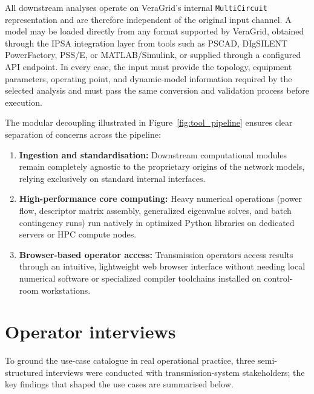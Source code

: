 All downstream analyses operate on VeraGrid's internal \texttt{MultiCircuit} representation and are therefore independent of the original input channel. A model may be loaded directly from any format supported by VeraGrid, obtained through the IPSA integration layer from tools such as PSCAD, DIgSILENT PowerFactory, PSS/E, or MATLAB/Simulink, or supplied through a configured API endpoint. In every case, the input must provide the topology, equipment parameters, operating point, and dynamic-model information required by the selected analysis and must pass the same conversion and validation process before execution.

The modular decoupling illustrated in Figure~\ref{fig:tool_pipeline} ensures clear separation of concerns across the pipeline:
\begin{enumerate}[before=\leavevmode, leftmargin=*]
  \item \textbf{Ingestion and standardisation:} Downstream computational modules remain completely agnostic to the proprietary origins of the network models, relying exclusively on standard internal interfaces.
  \item \textbf{High-performance core computing:} Heavy numerical operations (power flow, descriptor matrix assembly, generalized eigenvalue solves, and batch contingency runs) run natively in optimized Python libraries on dedicated servers or HPC compute nodes.
  \item \textbf{Browser-based operator access:} Transmission operators access results through an intuitive, lightweight web browser interface without needing local numerical software or specialized compiler toolchains installed on control-room workstations.
\end{enumerate}



\section{Operator interviews}
To ground the use-case catalogue in real operational practice, three semi-structured interviews were conducted with transmission-system stakeholders; the key findings that shaped the use cases are summarised below.

